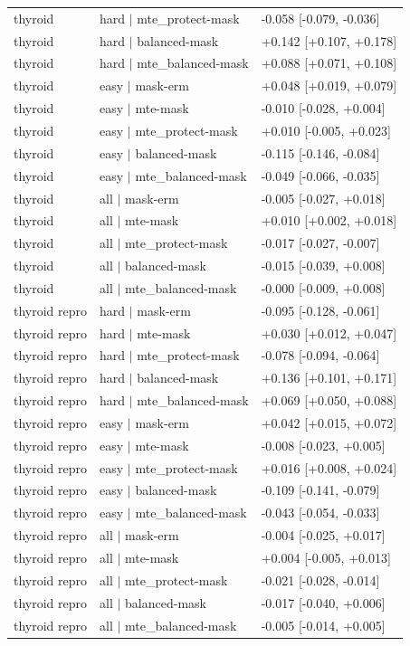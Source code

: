 \begin{table}[H]
\begin{tabular}{lll}
thyroid & hard $|$ mte\_protect-mask & -0.058 [-0.079, -0.036] \\
thyroid & hard $|$ balanced-mask & +0.142 [+0.107, +0.178] \\
thyroid & hard $|$ mte\_balanced-mask & +0.088 [+0.071, +0.108] \\
thyroid & easy $|$ mask-erm & +0.048 [+0.019, +0.079] \\
thyroid & easy $|$ mte-mask & -0.010 [-0.028, +0.004] \\
thyroid & easy $|$ mte\_protect-mask & +0.010 [-0.005, +0.023] \\
thyroid & easy $|$ balanced-mask & -0.115 [-0.146, -0.084] \\
thyroid & easy $|$ mte\_balanced-mask & -0.049 [-0.066, -0.035] \\
thyroid & all $|$ mask-erm & -0.005 [-0.027, +0.018] \\
thyroid & all $|$ mte-mask & +0.010 [+0.002, +0.018] \\
thyroid & all $|$ mte\_protect-mask & -0.017 [-0.027, -0.007] \\
thyroid & all $|$ balanced-mask & -0.015 [-0.039, +0.008] \\
thyroid & all $|$ mte\_balanced-mask & -0.000 [-0.009, +0.008] \\
thyroid repro & hard $|$ mask-erm & -0.095 [-0.128, -0.061] \\
thyroid repro & hard $|$ mte-mask & +0.030 [+0.012, +0.047] \\
thyroid repro & hard $|$ mte\_protect-mask & -0.078 [-0.094, -0.064] \\
thyroid repro & hard $|$ balanced-mask & +0.136 [+0.101, +0.171] \\
thyroid repro & hard $|$ mte\_balanced-mask & +0.069 [+0.050, +0.088] \\
thyroid repro & easy $|$ mask-erm & +0.042 [+0.015, +0.072] \\
thyroid repro & easy $|$ mte-mask & -0.008 [-0.023, +0.005] \\
thyroid repro & easy $|$ mte\_protect-mask & +0.016 [+0.008, +0.024] \\
thyroid repro & easy $|$ balanced-mask & -0.109 [-0.141, -0.079] \\
thyroid repro & easy $|$ mte\_balanced-mask & -0.043 [-0.054, -0.033] \\
thyroid repro & all $|$ mask-erm & -0.004 [-0.025, +0.017] \\
thyroid repro & all $|$ mte-mask & +0.004 [-0.005, +0.013] \\
thyroid repro & all $|$ mte\_protect-mask & -0.021 [-0.028, -0.014] \\
thyroid repro & all $|$ balanced-mask & -0.017 [-0.040, +0.006] \\
thyroid repro & all $|$ mte\_balanced-mask & -0.005 [-0.014, +0.005] \\
\bottomrule\end{tabular}\end{table}
